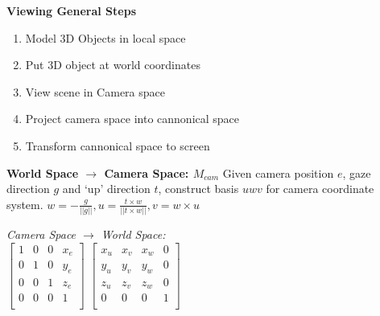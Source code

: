 \documentclass[letterpaper, 8pt]{extarticle}
\begin{document}
\begin{multicols*}{4}

    \textbf{Viewing General Steps}
    \begin{enumerate}
        \item Model 3D Objects in local space
        \item Put 3D object at world coordinates
        \item View scene in Camera space
        \item Project camera space into cannonical space
        \item Transform cannonical space to screen
    \end{enumerate}

    \textbf{World Space $\to$ Camera Space: $M_{cam}$}
    Given camera position $e$, gaze direction $g$ and `up' direction $t$, construct basis $uwv$ for camera coordinate system.
    $w = - \frac{g}{||g||}, u = \frac{t \times w}{||t \times w||}, v = w \times u$


    \textit{Camera Space $\to$ World Space:}\\
    \(
    \begin{bmatrix}
        1 & 0 & 0 & x_e \\
        0 & 1 & 0 & y_e \\
        0 & 0 & 1 & z_e \\
        0 & 0 & 0 & 1   \\
    \end{bmatrix}
    \)
    \(
    \begin{bmatrix}
        x_u & x_v & x_w & 0 \\
        y_u & y_v & y_w & 0 \\
        z_u & z_v & z_w & 0 \\
        0   & 0   & 0   & 1 \\
    \end{bmatrix}
    \)\\


\end{multicols*}
\end{document}
